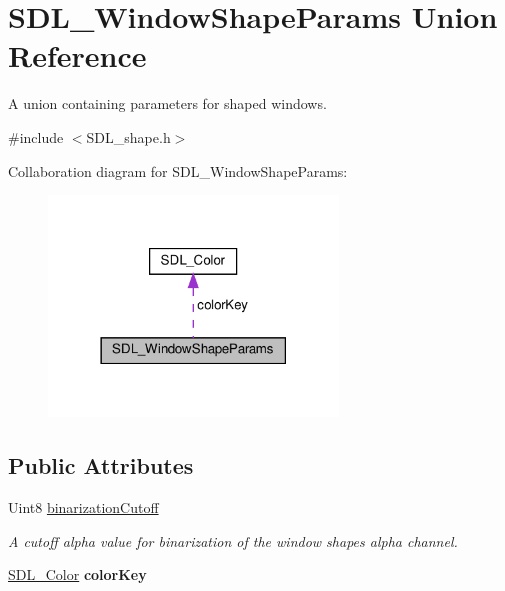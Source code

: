 \hypertarget{unionSDL__WindowShapeParams}{}\section{S\+D\+L\+\_\+\+Window\+Shape\+Params Union Reference}
\label{unionSDL__WindowShapeParams}


A union containing parameters for shaped windows.  




{\ttfamily \#include $<$S\+D\+L\+\_\+shape.\+h$>$}



Collaboration diagram for S\+D\+L\+\_\+\+Window\+Shape\+Params\+:\nopagebreak
\begin{figure}[H]
\begin{center}
\leavevmode
\includegraphics[width=218pt]{unionSDL__WindowShapeParams__coll__graph}
\end{center}
\end{figure}
\subsection*{Public Attributes}
\begin{DoxyCompactItemize}
\item 
\mbox{\label{unionSDL__WindowShapeParams_a534c40b09588a8075c0a70227753dc56}} 
Uint8 \hyperlink{unionSDL__WindowShapeParams_a534c40b09588a8075c0a70227753dc56}{binarization\+Cutoff}
\begin{DoxyCompactList}\small\item\em A cutoff alpha value for binarization of the window shape\textquotesingle{}s alpha channel. \end{DoxyCompactList}\item 
\mbox{\label{unionSDL__WindowShapeParams_a8bf3e442a51a1bbf452cfec7c1ed5318}} 
\hyperlink{structSDL__Color}{S\+D\+L\+\_\+\+Color} {\bfseries color\+Key}
\end{DoxyCompactItemize}


